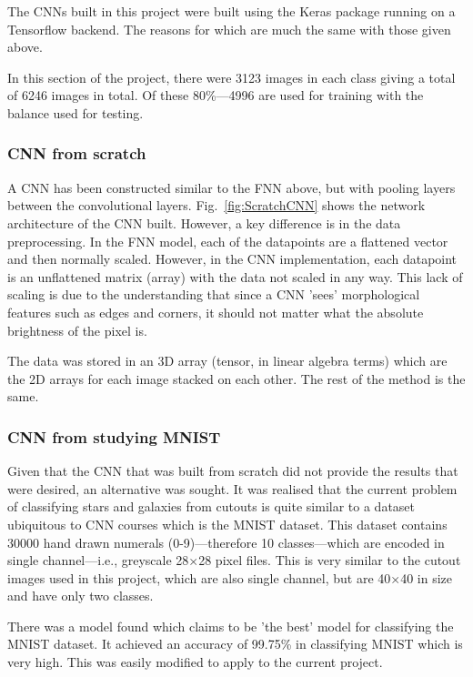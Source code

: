 \documentclass[a4paper,fleqn,usenatbib]{mnras}
\begin{document}
The CNNs built in this project were built using the Keras package running on a Tensorflow backend. The reasons for which are much the same with those given above. 

In this section of the project, there were 3123 images in each class giving a total of 6246 images in total. Of these 80\%---4996 are used for training with the balance used for testing. 

\subsubsection{CNN from scratch}
A CNN has been constructed similar to the FNN above, but with pooling layers between the convolutional layers. Fig.~\ref{fig:ScratchCNN} shows the network architecture of the CNN built. However, a key difference is in the data preprocessing. In the FNN model, each of the datapoints are a flattened vector and then normally scaled. However, in the CNN implementation, each datapoint is an unflattened matrix (array) with the data not scaled in any way. This lack of scaling is due to the understanding that since a CNN 'sees' morphological features such as edges and corners, it should not matter what the absolute brightness of the pixel is. 

The data was stored in an 3D array (tensor, in linear algebra terms) which are the 2D arrays for each image stacked on each other. The rest of the method is the same. 

\subsubsection{CNN from studying MNIST}
Given that the CNN that was built from scratch did not provide the results that were desired, an alternative was sought. It was realised that the current problem of classifying stars and galaxies from cutouts is quite similar to a dataset ubiquitous to CNN courses which is the MNIST dataset.\cite{MNIST} This dataset contains 30000 hand drawn numerals (0-9)---therefore 10 classes---which are encoded in single channel---i.e., greyscale 28$\times$28 pixel files. This is very similar to the cutout images used in this project, which are also single channel, but are 40$\times$40 in size and have only two classes. 

There was a model found which claims to be 'the best' model for classifying the MNIST dataset. \cite{KaggleMNIST} It achieved an accuracy of 99.75\% in classifying MNIST which is very high. This was easily modified to apply to the current project. 
\end{document}
